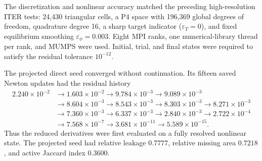 The discretization and nonlinear accuracy matched the preceding
high-resolution ITER tests: 24,430 triangular cells, a P4 space with 196,369
global degrees of freedom, quadrature degree 16, a sharp target indicator
($\varepsilon_T=0$), and fixed equilibrium smoothing
$\varepsilon_\phi=0.003$. Eight MPI ranks, one numerical-library thread per
rank, and MUMPS were used. Initial, trial, and final states were required to
satisfy the residual tolerance $10^{-12}$.

The projected direct seed converged without continuation. Its fifteen saved
Newton updates had the residual history
\[
\begin{aligned}
  2.240\!\times\!10^{-2}&\to1.603\!\times\!10^{-2}
  \to9.784\!\times\!10^{-3}\to9.089\!\times\!10^{-3}\\
  &\to8.604\!\times\!10^{-3}\to8.543\!\times\!10^{-3}
  \to8.303\!\times\!10^{-3}\to8.271\!\times\!10^{-3}\\
  &\to7.360\!\times\!10^{-3}\to6.337\!\times\!10^{-3}
  \to2.840\!\times\!10^{-3}\to2.722\!\times\!10^{-4}\\
  &\to7.568\!\times\!10^{-7}\to3.681\!\times\!10^{-11}
  \to5.589\!\times\!10^{-15}.
\end{aligned}
\]
Thus the reduced derivatives were first evaluated on a fully resolved
nonlinear state. The projected seed had relative leakage $0.7777$, relative
missing area $0.7218$, and active Jaccard index $0.3600$.

